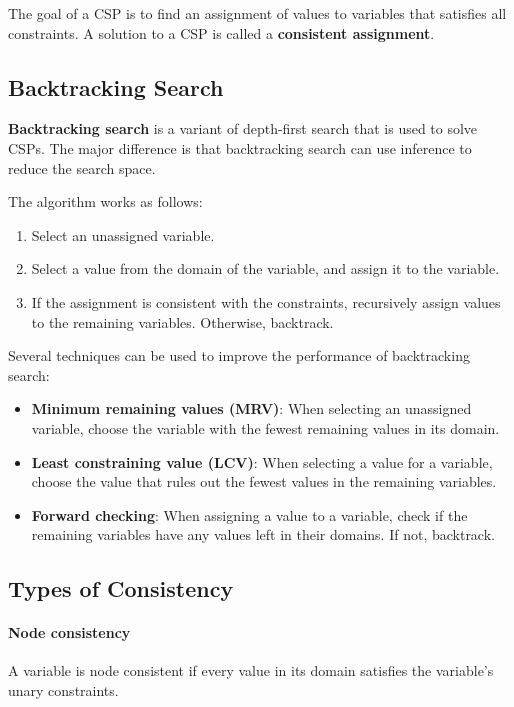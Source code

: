 \documentclass[a4paper,12pt]{article}
\begin{document}
The goal of a CSP is to find an assignment of values to variables that satisfies all constraints. A solution to a CSP is called a \textbf{consistent assignment}.

\subsection{Backtracking Search}

\textbf{Backtracking search} is a variant of depth-first search that is used to solve CSPs. The major difference is that backtracking search can use inference to reduce the search space.

The algorithm works as follows:
\begin{enumerate}
  \item Select an unassigned variable.
  \item Select a value from the domain of the variable, and assign it to the variable.
  \item If the assignment is consistent with the constraints, recursively assign values to the remaining variables. Otherwise, backtrack.
\end{enumerate}

Several techniques can be used to improve the performance of backtracking search:
\begin{itemize}
  \item \textbf{Minimum remaining values (MRV)}: When selecting an unassigned variable, choose the variable with the fewest remaining values in its domain.
  \item \textbf{Least constraining value (LCV)}: When selecting a value for a variable, choose the value that rules out the fewest values in the remaining variables.
  \item \textbf{Forward checking}: When assigning a value to a variable, check if the remaining variables have any values left in their domains. If not, backtrack.
\end{itemize}

\subsection{Types of Consistency}

\paragraph{Node consistency} A variable is node consistent if every value in its domain satisfies the variable's unary constraints.
\end{document}
